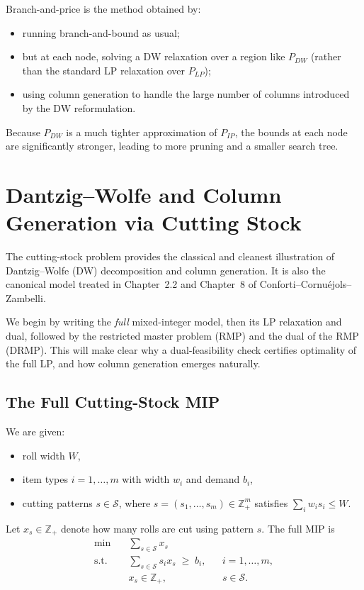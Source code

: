 \documentclass[11pt]{article}
\begin{document}
Branch-and-price is the method obtained by:
\begin{itemize}
    \item running branch-and-bound as usual;
    \item but at each node, solving a DW relaxation over a region like $P_{DW}$
          (rather than the standard LP relaxation over $P_{LP}$);
    \item using column generation to handle the large number of columns
          introduced by the DW reformulation.
\end{itemize}
Because $P_{DW}$ is a much tighter approximation of $P_{IP}$, the bounds at
each node are significantly stronger, leading to more pruning and a smaller
search tree.

\section{Dantzig--Wolfe and Column Generation via Cutting Stock}

The cutting-stock problem provides the classical and cleanest illustration
of Dantzig--Wolfe (DW) decomposition and column generation.
It is also the canonical model treated in Chapter~2.2 and Chapter~8 of
Conforti--Cornu\'ejols--Zambelli.

We begin by writing the \emph{full} mixed-integer model, then its LP
relaxation and dual, followed by the restricted master problem (RMP) and
the dual of the RMP (DRMP).
This will make clear why a dual-feasibility check certifies optimality of
the full LP, and how column generation emerges naturally.

\subsection{The Full Cutting-Stock MIP}

We are given:
\begin{itemize}
    \item roll width $W$,
    \item item types $i=1,\dots,m$ with width $w_i$ and demand $b_i$,
    \item cutting patterns $s \in \mathcal{S}$, where
          $s = (s_1,\dots,s_m) \in \mathbb{Z}_+^m$ satisfies
          $\sum_i w_i s_i \le W$.
\end{itemize}

Let $x_s \in \mathbb{Z}_+$ denote how many rolls are cut using pattern $s$.
The full MIP is
\begin{align}
\min \quad & \sum_{s\in\mathcal{S}} x_s
    \label{eq:full_mip_obj} \\
\text{s.t.}\quad
& \sum_{s\in\mathcal{S}} s_i x_s \;\ge\; b_i,
    && i=1,\dots,m, \label{eq:full_mip_demands} \\
& x_s \in \mathbb{Z}_+, && s\in\mathcal{S}. \label{eq:full_mip_int}
\end{align}
\end{document}
